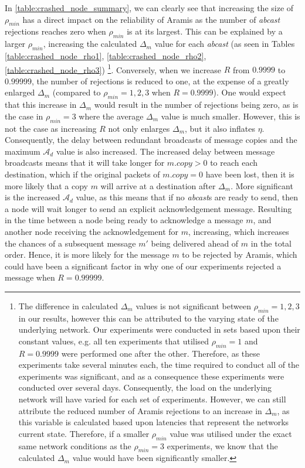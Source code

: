     In \ref{table:crashed_node_summary}, we can clearly see that increasing the size of $\rho_{min}$ has a direct impact on the reliability of \textsf{Aramis} as the number of \emph{abcast} rejections reaches zero when $\rho_{min}$ is at its largest.  This can be explained by a larger $\rho_{min}$, increasing the calculated $\Delta_m$ value for each \emph{abcast} (as seen in Tables \ref{table:crashed_node_rho1}, \ref{table:crashed_node_rho2},  \ref{table:crashed_node_rho3}) \footnote{The difference in calculated $\Delta_m$ values is not significant between $\rho_{min}=1,2,3$ in our results, however this can be attributed to the varying state of the underlying network.  Our experiments were conducted in sets based upon their constant values, e.g. all ten experiments that utilised $\rho_{min}=1$ and $R=0.9999$ were performed one after the other.  Therefore, as these experiments take several minutes each, the time required to conduct all of the experiments was significant, and as a consequence these experiments were conducted over several days.  Consequently, the load on the underlying network will have varied for each set of experiments.  However, we can still attribute the reduced number of \textsf{Aramis rejections} to an increase in $\Delta_m$, as this variable is calculated based upon latencies that represent the networks current state.  Therefore, if a smaller $\rho_{min}$ value was utilised under the exact same network conditions as the $\rho_{min}=3$ experiments, we know that the calculated $\Delta_m$ value would have been significantly smaller.}.  Conversely, when we increase $R$ from $0.9999$ to $0.99999$, the number of rejections is reduced to one, at the expense of a greatly enlarged $\Delta_m$ (compared to $\rho_{min}=1,2,3$ when $R=0.9999$).  One would expect that this increase in $\Delta_m$ would result in the number of rejections being zero, as is the case in $\rho_{min}=3$ where the average $\Delta_m$ value is much smaller.  However, this is not the case as increasing $R$ not only enlarges $\Delta_m$, but it also inflates $\eta$.  Consequently, the delay between redundant broadcasts of message copies and the maximum $\mathcal{A}_d$ value is also increased.  The increased delay between message broadcasts means that it will take longer for $m.copy > 0$ to reach each destination, which if the original packets of $m.copy = 0$ have been lost, then it is more likely that a copy $m$ will arrive at a destination after $\Delta_m$.  More significant is the increased  $\mathcal{A}_d$ value, as this means that if no \emph{abcast}s are ready to send, then a node will wait longer to send an explicit acknowledgement message.  Resulting in the time between a node being ready to acknowledge a message $m$, and another node receiving the acknowledgement for $m$, increasing, which increases the chances of a subsequent message $m'$ being delivered ahead of $m$ in the total order. Hence, it is more likely for the message $m$ to be rejected by \textsf{Aramis}, which could have been a significant factor in why one of our experiments rejected a message when $R=0.99999$.  
    
